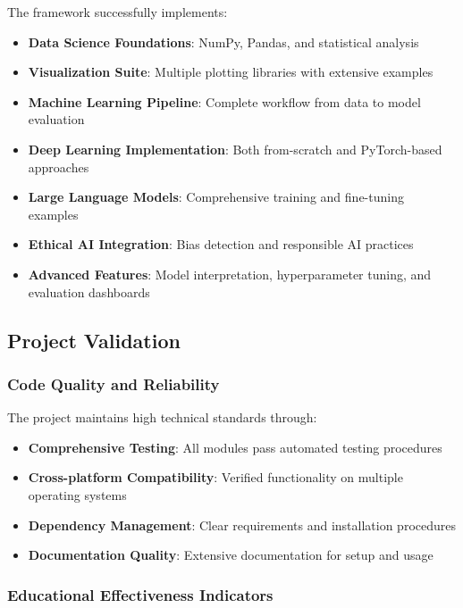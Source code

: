 The framework successfully implements:

\begin{itemize}
    \item \textbf{Data Science Foundations}: NumPy, Pandas, and statistical analysis
    \item \textbf{Visualization Suite}: Multiple plotting libraries with extensive examples
    \item \textbf{Machine Learning Pipeline}: Complete workflow from data to model evaluation
    \item \textbf{Deep Learning Implementation}: Both from-scratch and PyTorch-based approaches
    \item \textbf{Large Language Models}: Comprehensive training and fine-tuning examples
    \item \textbf{Ethical AI Integration}: Bias detection and responsible AI practices
    \item \textbf{Advanced Features}: Model interpretation, hyperparameter tuning, and evaluation dashboards
\end{itemize}

\subsection{Project Validation}

\subsubsection{Code Quality and Reliability}

The project maintains high technical standards through:

\begin{itemize}
    \item \textbf{Comprehensive Testing}: All modules pass automated testing procedures
    \item \textbf{Cross-platform Compatibility}: Verified functionality on multiple operating systems
    \item \textbf{Dependency Management}: Clear requirements and installation procedures
    \item \textbf{Documentation Quality}: Extensive documentation for setup and usage
\end{itemize}

\subsubsection{Educational Effectiveness Indicators}


